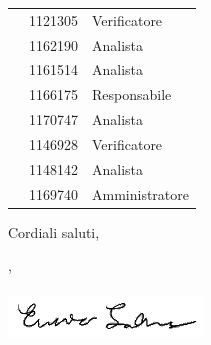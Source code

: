 \documentclass[12pt]{letter}
\begin{document}
\begin{letter}
{\begin{longtable}{ C{4cm} C{3cm} C{6cm} }
                \endhead 
                \MC{} & 1121305 & Verificatore \\
                \LD{} & 1162190 & Analista \\
                \CE{} & 1161514 & Analista \\
                \SE{} & 1166175 & Responsabile \\
                \PF{} & 1170747 & Analista \\
                \DF{} & 1146928 & Verificatore \\
                \BR{} & 1148142 & Analista \\
                \AT{} & 1169740 & Amministratore \\  
            \end{longtable}
        }
        Cordiali saluti,
        \closing{\SE{}, \\ \textit{\Responsabile{}}\\ \includegraphics[width=.6\linewidth]{../DocumentazioneEsterna/PianoDiProgetto/sezioni/Firme/Enrico.png}}
        \vspace{10mm}
    \end{letter}
\end{document}
